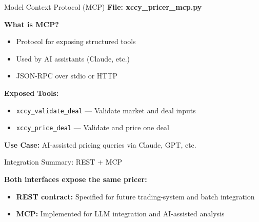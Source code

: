 \documentclass[aspectratio=169,11pt]{beamer}
\begin{document}
\begin{frame}{Model Context Protocol (MCP)}
\textbf{File: xccy\_pricer\_mcp.py}

\textbf{What is MCP?}
\begin{itemize}
    \item Protocol for exposing structured tools
    \item Used by AI assistants (Claude, etc.)
    \item JSON-RPC over stdio or HTTP
\end{itemize}

\textbf{Exposed Tools:}
\begin{itemize}
    \item \texttt{xccy\_validate\_deal} --- Validate market and deal inputs
    \item \texttt{xccy\_price\_deal} --- Validate and price one deal
\end{itemize}

\textbf{Use Case:} AI-assisted pricing queries via Claude, GPT, etc.
\end{frame}

\begin{frame}{Integration Summary: REST + MCP}
\begin{center}
\end{center}

\textbf{Both interfaces expose the same pricer:}
\begin{itemize}
    \item \textbf{REST contract:} Specified for future trading-system and batch integration
    \item \textbf{MCP:} Implemented for LLM integration and AI-assisted analysis
\end{itemize}
\end{frame}
\end{document}
